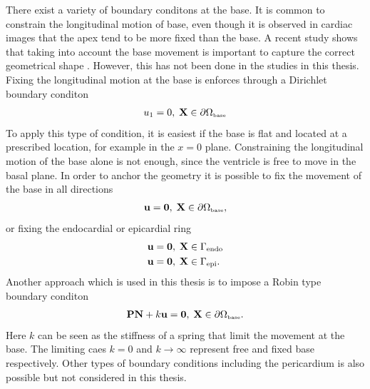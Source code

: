 There exist a variety of boundary conditons at the base.
It is common to constrain the longitudinal motion of
base, even though it is observed in cardiac images that the apex tend
to be more fixed than the base. A recent study shows that taking into
account the base movement is important to capture the correct
geometrical shape \cite{palit2016passive}. However, this has not been
done in the studies in this thesis.
Fixing the longitudinal motion at the base is enforces through a
Dirichlet boundary conditon
\begin{align}
  u_1 = 0,  \;  \mathbf{X} \in \partial \Omega_{ \textnormal{\tiny\text{base}}}
\end{align}
To apply this type of condition, it is easiest if the base is
flat and located at a prescribed location, for example in the $x= 0$
plane.
Constraining the longitudinal motion of the base alone is not enough,
since the ventricle is free to move in the basal plane. In order to
anchor the geometry it is possible to fix the movement of the base in
all directions
\begin{align}
  \mathbf{u} = \mathbf{0},  \;  \mathbf{X} \in \partial \Omega_{ \textnormal{\tiny\text{base}}},
\end{align}
or fixing the endocardial or epicardial ring
\begin{align}
  \mathbf{u} &= \mathbf{0},  \;  \mathbf{X} \in \Gamma_{\mathrm{endo}} \\
  \mathbf{u} &= \mathbf{0},  \;  \mathbf{X} \in \Gamma_{\mathrm{epi}}.
\end{align}
Another approach which is used in this thesis is to impose a Robin
type boundary conditon
\begin{align}
  \mathbf{P} \mathbf{N} + k \mathbf{u} = \mathbf{0},  \;  \mathbf{X} \in \partial \Omega_{ \textnormal{\tiny\text{base}}}.
\end{align}
Here $k$ can be seen as the stiffness of a spring that limit the
movement at the base. The limiting caes $k = 0$ and $k \rightarrow
\infty$ represent free and fixed base respectively.
Other types of boundary conditions including the pericardium is also
possible \cite{fritz2014simulation} but not considered in this thesis.



